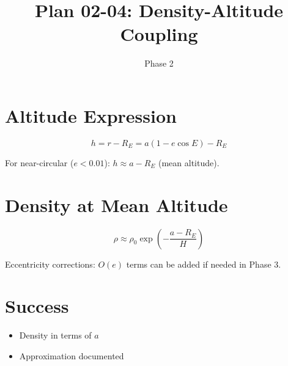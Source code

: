\documentclass[11pt]{article}
\title{Plan 02-04: Density-Altitude Coupling}
\date{Phase 2}
\begin{document}
\maketitle

\section{Altitude Expression}
$$h = r - R_E = a(1 - e\cos E) - R_E$$

For near-circular ($e < 0.01$): $h \approx a - R_E$ (mean altitude).

\section{Density at Mean Altitude}
$$\rho \approx \rho_0 \exp\left(-\frac{a - R_E}{H}\right)$$

Eccentricity corrections: $O(e)$ terms can be added if needed in Phase 3.

\section{Success}
\begin{itemize}
\item[$\checkmark$] Density in terms of $a$
\item[$\checkmark$] Approximation documented
\end{itemize}
\end{document}
